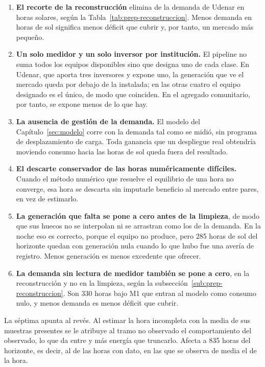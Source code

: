 \begin{enumerate}[leftmargin=*, itemsep=0.35em]
 \item \textbf{El recorte de la reconstrucción} elimina
  de la demanda de Udenar en horas solares, según la
 Tabla~\ref{tab:prep-reconstruccion}. Menos demanda en horas de sol
 significa menos déficit que cubrir y, por tanto, un mercado más
 pequeño.

 \item \textbf{Un solo medidor y un solo inversor por institución.} El
 pipeline no suma todos los equipos disponibles sino que designa uno de
 cada clase. En Udenar, que aporta tres inversores y expone uno, la
 generación que ve el mercado queda por debajo de la instalada; en las
 otras cuatro el equipo designado es el único, de modo que coinciden.
 En el agregado comunitario, por tanto, se expone menos de lo que hay.

 \item \textbf{La ausencia de gestión de la demanda.} El modelo del
 Capítulo~\ref{sec:modelo} corre con la demanda tal como se midió, sin
 programa de desplazamiento de carga. Toda ganancia que un despliegue
 real obtendría moviendo consumo hacia las horas de sol queda fuera del
 resultado.

 \item \textbf{El descarte conservador de las horas numéricamente
 difíciles.} Cuando el método numérico que resuelve el equilibrio
 de una hora no converge, esa hora se descarta sin imputarle beneficio
 al mercado entre pares, en vez de estimarlo.

 \item \textbf{La generación que falta se pone a cero antes de la
 limpieza}, de modo que sus huecos no se interpolan ni se arrastran como
 los de la demanda. En la noche eso es correcto, porque el equipo no
 produce, pero \num{285} horas de sol del horizonte quedan con generación
 nula cuando lo que hubo fue una avería de registro. Menos generación es
 menos excedente que ofrecer.

 \item \textbf{La demanda sin lectura de medidor también se pone a cero},
 en la reconstrucción y no en la limpieza, según la
 subsección~\ref{sub:prep-reconstruccion}. Son \num{330} horas bajo M1 que
 entran al modelo como consumo nulo, y menos demanda es menos déficit que
 cubrir.
\end{enumerate}

La séptima apunta al revés. Al estimar la hora incompleta con la media de
sus muestras presentes se le atribuye al tramo no observado el
comportamiento del observado, lo que da entre  y  más
energía que truncarlo. Afecta a \num{835} horas del horizonte, es decir, al
 de las horas con dato, en las que se observa de media el
 de la hora.

